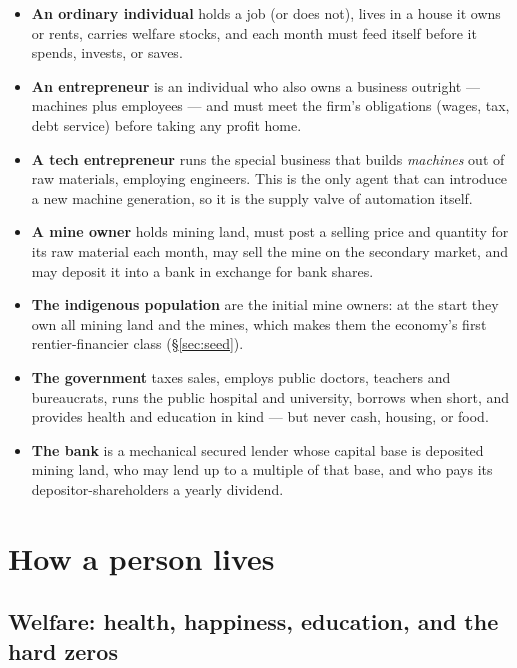 \documentclass[11pt]{article}
\begin{document}
\begin{itemize}
  \item \textbf{An ordinary individual} holds a job (or does not), lives in a
  house it owns or rents, carries welfare stocks, and each month must feed
  itself before it spends, invests, or saves.
  \item \textbf{An entrepreneur} is an individual who also owns a business
  outright --- machines plus employees --- and must meet the firm's
  obligations (wages, tax, debt service) before taking any profit home.
  \item \textbf{A tech entrepreneur} runs the special business that builds
  \emph{machines} out of raw materials, employing engineers. This is the only
  agent that can introduce a new machine generation, so it is the supply valve
  of automation itself.
  \item \textbf{A mine owner} holds mining land, must post a selling price and
  quantity for its raw material each month, may sell the mine on the secondary
  market, and may deposit it into a bank in exchange for bank shares.
  \item \textbf{The indigenous population} are the initial mine owners: at the
  start they own all mining land and the mines, which makes them the economy's
  first rentier-financier class (\S\ref{sec:seed}).
  \item \textbf{The government} taxes sales, employs public doctors, teachers
  and bureaucrats, runs the public hospital and university, borrows when short,
  and provides health and education in kind --- but never cash, housing, or
  food.
  \item \textbf{The bank} is a mechanical secured lender whose capital base is
  deposited mining land, who may lend up to a multiple of that base, and who
  pays its depositor-shareholders a yearly dividend.
\end{itemize}

\section{How a person lives}

\subsection{Welfare: health, happiness, education, and the hard zeros}
\label{sec:welfare}
\end{document}
